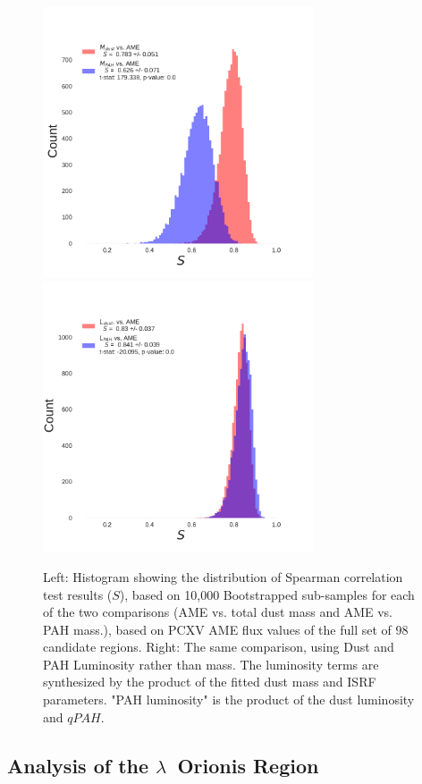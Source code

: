 \documentclass[preprint2,longabstract]{aastex}
\begin{document}
\begin{figure}
  \label{fig:AME_boostrap_regs_all}

  \includegraphics[width=80mm]{../Plots/RegsAME_Bootstrap_MDustandMPAH.pdf}
  \includegraphics[width=80mm]{../Plots/RegsAME_Bootstrap_LDustandLPAH.pdf}

  \centering
  \caption{Left: Histogram showing the distribution of Spearman correlation test results ($S$), based on 10,000 Bootstrapped sub-samples for each of the two comparisons (AME vs. total dust mass and AME vs. PAH mass.), based on PCXV AME flux values of the full set of 98 candidate regions. Right: The same comparison, using Dust and PAH Luminosity rather than mass. The luminosity terms are synthesized by the product of the fitted dust mass and ISRF parameters. "PAH luminosity" is the product of the dust luminosity and $qPAH$.}

\end{figure}

\subsection{Analysis of the $\lambda$~Orionis Region}
\end{document}
